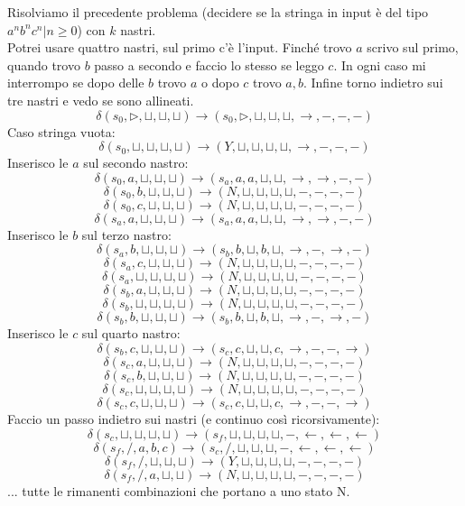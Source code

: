 \begin{esempio}
  Risolviamo il precedente problema (decidere se la stringa in input è del tipo
  $a^nb^nc^n | n\geq0$) con $k$ nastri.\\
  Potrei usare quattro nastri, sul primo c'è l'input. Finché trovo $a$ scrivo sul
  primo, quando trovo $b$ passo a secondo e faccio lo stesso se leggo $c$. In
  ogni caso mi interrompo se dopo delle $b$ trovo $a$ o dopo $c$ trovo
  $a,b$. Infine torno indietro sui tre nastri e vedo se sono allineati.
    \[\delta(s_0,\triangleright, \sqcup, \sqcup, \sqcup)\to (s_0, \triangleright , \sqcup, \sqcup, \sqcup, \rightarrow, -, - ,-)\]
    Caso stringa vuota:
    \[\delta(s_0,\sqcup, \sqcup, \sqcup, \sqcup)\to (Y, \sqcup , \sqcup, \sqcup, \sqcup, \rightarrow, -, -, -)\]
    Inserisco le $a$ sul secondo nastro:
    \[\delta(s_0, a, \sqcup, \sqcup, \sqcup)\to (s_a, a , a, \sqcup, \sqcup, \rightarrow, \rightarrow, -, -)\]
    \[\delta(s_0, b, \sqcup, \sqcup, \sqcup)\to (N, \sqcup, \sqcup, \sqcup, \sqcup, -, -, -, -)\]
    \[\delta(s_0, c, \sqcup, \sqcup, \sqcup)\to (N, \sqcup, \sqcup, \sqcup, \sqcup, -, -, -, -)\]
    \[\delta(s_a, a, \sqcup, \sqcup, \sqcup)\to (s_a, a, a, \sqcup, \sqcup, \rightarrow, \rightarrow, -, -)\]
    Inserisco le $b$ sul terzo nastro:
    \[\delta(s_a, b, \sqcup, \sqcup, \sqcup)\to (s_b, b, \sqcup, b, \sqcup, \rightarrow,  -, \rightarrow, -)\]
    \[\delta(s_a, c, \sqcup, \sqcup, \sqcup)\to (N, \sqcup, \sqcup, \sqcup, \sqcup, -, -, -, -)\]
    \[\delta(s_a, \sqcup, \sqcup, \sqcup, \sqcup)\to (N, \sqcup, \sqcup, \sqcup, \sqcup, -, -, -, -)\]
    \[\delta(s_b, a, \sqcup, \sqcup, \sqcup)\to (N, \sqcup, \sqcup, \sqcup, \sqcup, -, -, -, -)\]
    \[\delta(s_b, \sqcup, \sqcup, \sqcup, \sqcup)\to (N, \sqcup, \sqcup, \sqcup, \sqcup, -, -, -, -)\]
    \[\delta(s_b, b, \sqcup, \sqcup, \sqcup)\to (s_b, b, \sqcup, b, \sqcup, \rightarrow, -, \rightarrow, -)\]
    Inserisco le $c$ sul quarto nastro:
    \[\delta(s_b, c, \sqcup, \sqcup, \sqcup)\to (s_c, c, \sqcup, \sqcup, c, \rightarrow, -, -, \rightarrow)\]
    \[\delta(s_c, a, \sqcup, \sqcup, \sqcup)\to (N, \sqcup, \sqcup, \sqcup, \sqcup, -, -, -, -)\]
    \[\delta(s_c, b, \sqcup, \sqcup, \sqcup)\to (N, \sqcup, \sqcup, \sqcup, \sqcup, -, -, -, -)\]
    \[\delta(s_c, \sqcup, \sqcup, \sqcup, \sqcup)\to (N, \sqcup, \sqcup, \sqcup, \sqcup, -, -, -, -)\]
    \[\delta(s_c, c, \sqcup, \sqcup, \sqcup)\to (s_c, c, \sqcup, \sqcup, c, \rightarrow, -, -, \rightarrow)\]
    Faccio un passo indietro sui nastri (e continuo così ricorsivamente):
    \[\delta(s_c, \sqcup, \sqcup, \sqcup, \sqcup)\to (s_f, \sqcup, \sqcup, \sqcup, \sqcup, -, \leftarrow, \leftarrow, \leftarrow)\]
    \[\delta(s_f, /, a, b, c)\to (s_c, /, \sqcup, \sqcup, \sqcup, -, \leftarrow, \leftarrow, \leftarrow)\]
    \[\delta(s_f, /, \sqcup, \sqcup, \sqcup)\to (Y, \sqcup, \sqcup, \sqcup, \sqcup, -, -, -, -)\]
    \[\delta(s_f, /, a, \sqcup, \sqcup)\to (N, \sqcup, \sqcup, \sqcup, \sqcup, -, -, -, -)\]
    ... tutte le rimanenti combinazioni che portano a uno stato N.
\end{esempio}

